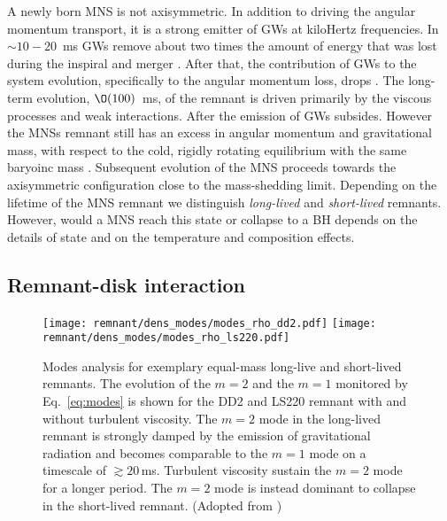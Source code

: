 
A newly born \ac{MNS} is not axisymmetric. In addition to driving the angular 
momentum transport, it is a strong emitter of \acp{GW} at kiloHertz frequencies.
In ${\sim}10-20$~ms \pmerg{} \acp{GW} remove about two times the 
amount of energy that was lost during the inspiral and merger \citep{Bernuzzi:2015opx}.
%
After that, the contribution of \acp{GW} to the system evolution, specifically to the 
angular momentum loss, drops \citep{Radice:2018xqa}. The long-term evolution, $\O(100)$~ms,
of the remnant is driven primarily by the viscous processes and weak interactions.
%
After the emission of \acp{GW} subsides. However the \acp{MNS} remnant still has an excess 
in angular momentum and gravitational mass, with respect to the cold, 
rigidly rotating equilibrium with the same baryoinc mass \citep{Radice:2018xqa}.
%
Subsequent evolution of the \ac{MNS} proceeds towards the axisymmetric configuration 
close to the mass-shedding limit. 
Depending on the lifetime of the \ac{MNS} remnant we distinguish \textit{long-lived}
and \textit{short-lived} remnants.
However, would a \ac{MNS} reach this state or collapse to a \ac{BH} depends on the 
details of \pmerg{} state and on the temperature and composition effects.
%


\subsection{Remnant-disk interaction}\label{sec:bns_sims:remdisk}

\begin{figure*}[t]
    \centering 
    \texttt{[image: remnant/dens\_modes/modes\_rho\_dd2.pdf]}
    \texttt{[image: remnant/dens\_modes/modes\_rho\_ls220.pdf]}
    \caption{Modes analysis for exemplary equal-mass long-live and short-lived
        remnants. The evolution of the $m=2$ and the $m=1$ monitored by
        Eq.~\eqref{eq:modes} is shown for the DD2 and LS220 remnant with and
        without turbulent viscosity. The $m=2$ mode in the long-lived
        remnant is strongly damped by the emission of gravitational
        radiation and becomes comparable to the $m=1$ mode on a timescale of
        ${\gtrsim}20\,$ms. Turbulent viscosity sustain the $m=2$ mode for
        a longer period. The $m=2$ mode is instead dominant to collapse in
        the short-lived remnant.
        (Adopted from \cite{Nedora:2020pak})
    }
    \label{fig:dens_modes}
\end{figure*}

